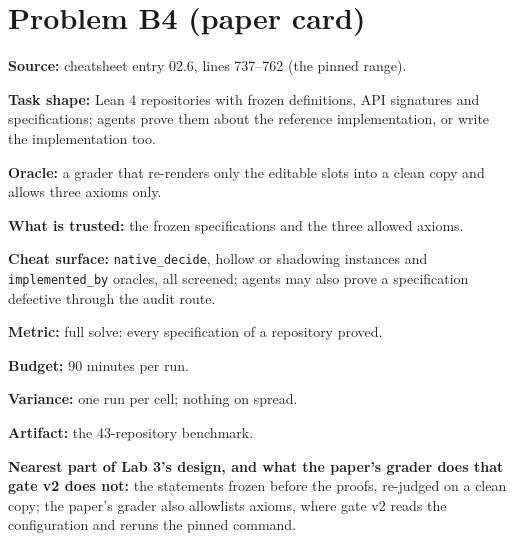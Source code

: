 \documentclass[11pt]{article}
\begin{document}
\section*{Problem B4 (paper card)}\label{ans:B4}
\begin{answer}
\textbf{Source:} cheatsheet entry 02.6, lines 737--762 (the pinned range).

\textbf{Task shape:} Lean 4 repositories with frozen definitions, API
signatures and specifications; agents prove them about the reference
implementation, or write the implementation too.

\textbf{Oracle:} a grader that re-renders only the editable slots into a
clean copy and allows three axioms only.

\textbf{What is trusted:} the frozen specifications and the three allowed
axioms.

\textbf{Cheat surface:} \texttt{native\_decide}, hollow or shadowing
instances and \texttt{implemented\_by} oracles, all screened; agents may
also prove a specification defective through the audit route.

\textbf{Metric:} full solve: every specification of a repository proved.

\textbf{Budget:} 90 minutes per run.

\textbf{Variance:} one run per cell; nothing on spread.

\textbf{Artifact:} the 43-repository benchmark.

\textbf{Nearest part of Lab 3's design, and what the paper's grader does that
gate v2 does not:} the statements frozen before the proofs, re-judged on a
clean copy; the paper's grader also allowlists axioms, where gate v2 reads
the configuration and reruns the pinned command.
\end{answer}

\end{document}
